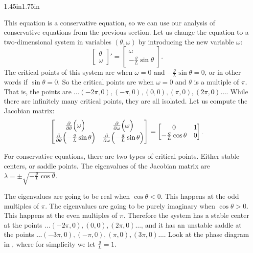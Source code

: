 \begin{mywrapfigsimp}{1.45in}{1.75in}
\noindent
{}
\end{mywrapfigsimp}
This equation is a conservative
equation, so we can use our analysis of conservative equations
from the previous section.
Let us change the equation to a two-dimensional
system in variables $(\theta,\omega)$ by introducing the new
variable $\omega$:
\begin{equation*}
\begin{bmatrix}
\theta \\ \omega
\end{bmatrix} '
=
\begin{bmatrix}
\omega \\
- \frac{g}{L} \sin \theta
\end{bmatrix} .
\end{equation*}
The critical points of this system are when $\omega = 0$ and $-\frac{g}{L}
\sin \theta = 0$, or in other words if $\sin \theta = 0$.  So the critical
points are when $\omega = 0$ and $\theta$ is a multiple of $\pi$.  That is,
the points are $\ldots (-2\pi,0), (-\pi,0), (0,0), (\pi,0), (2\pi,0)
\ldots$.  While there are infinitely many critical points, they are all isolated.
Let us compute the Jacobian matrix:
\begin{equation*}
\begin{bmatrix}
\frac{\partial}{\partial \theta} \Bigl( \omega \Bigr) & 
\frac{\partial}{\partial \omega} \Bigl( \omega \Bigr) \\
\frac{\partial}{\partial \theta} \Bigl( - \frac{g}{L} \sin \theta \Bigr) & 
\frac{\partial}{\partial \omega} \Bigl( - \frac{g}{L} \sin \theta \Bigr)
\end{bmatrix}
=
\begin{bmatrix}
0 & 1 \\
- \frac{g}{L} \cos \theta & 0
\end{bmatrix} .
\end{equation*}

For conservative equations, there are two types of
critical points.  Either stable centers, or saddle points.  The eigenvalues
of the Jacobian matrix are $\lambda = \pm \sqrt{-\frac{g}{L}\cos \theta}$.

The
eigenvalues are going to be real when $\cos \theta < 0$.  This happens at the odd multiples of $\pi$.
The
eigenvalues are going to be purely imaginary 
when $\cos \theta > 0$.  This happens at the even
multiples of $\pi$.  Therefore the system has a stable center at
the points $\ldots (-2\pi,0), (0,0), (2\pi,0) \ldots$, and it has an
unstable saddle at
the points $\ldots (-3\pi,0), (-\pi,0), (\pi,0), (3\pi,0) \ldots$.  Look at the
phase diagram in ,
where for simplicity we let $\frac{g}{L} = 1$.

